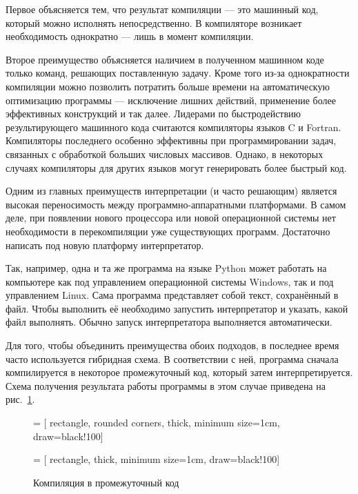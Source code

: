 Первое объясняется тем, что результат компиляции — это машинный код,
который можно исполнять непосредственно. В компиляторе возникает
необходимость однократно — лишь в момент компиляции.

Второе преимущество объясняется наличием в полученном машинном коде
только команд, решающих поставленную задачу. Кроме того из-за
однократности компиляции можно позволить потратить больше времени на
автоматическую оптимизацию программы — исключение лишних действий,
применение более эффективных конструкций и так далее. Лидерами по
быстродействию результирующего машинного кода считаются компиляторы
языков C и Fortran. Компиляторы последнего особенно эффективны при
программировании задач, связанных с обработкой больших числовых
массивов. Однако, в некоторых случаях компиляторы для других языков
могут генерировать более быстрый код.

Одним из главных преимуществ интерпретации (и часто решающим) является
высокая переносимость между программно-аппаратными платформами. В
самом деле, при появлении нового процессора или новой операционной
системы нет необходимости в перекомпиляции уже существующих программ.
Достаточно написать под новую платформу интерпретатор.

Так, например, одна и та же программа на языке Python может работать
на компьютере как под управлением операционной системы Windows, так и
под управлением Linux. Сама программа представляет собой текст,
сохранённый в файл. Чтобы выполнить её необходимо запустить
интерпретатор и указать, какой файл выполнять. Обычно запуск
интерпретатора выполняется автоматически.

Для того, чтобы объединить преимущества обоих подходов, в последнее
время часто используется гибридная схема. В соответствии с ней,
программа сначала компилируется в некоторое промежуточный код, который
затем интерпретируется. Схема получения результата работы программы в
этом случае приведена на рис.~\ref{fig:pcode}.

\begin{figure}
  \begin{centering}
     = [
      rectangle,
      rounded corners,
      thick,
      minimum size=1cm,
      draw=black!100]
    
     = [
      rectangle,
      thick,
      minimum size=1cm,
      draw=black!100]
    
    \par
  \end{centering}
  
  \caption{Компиляция в промежуточный код\label{fig:pcode}}
\end{figure}


